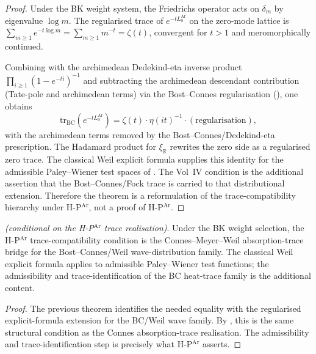 \begin{proof}
Under the BK weight system, the Friedrichs operator acts on
\(\delta_{m}\) by eigenvalue \(\log m\). The regularised trace of
\(e^{-tL_{0}^{\mathrm{Ar}}}\) on the zero-mode lattice is
\(\sum_{m\geq 1}e^{-t\log m}=\sum_{m\geq 1}m^{-t}=\zeta(t)\), convergent
for \(t>1\) and meromorphically continued.

Combining with the archimedean Dedekind-eta inverse product
\(\prod_{i\geq 1}(1-e^{-ti})^{-1}\) and subtracting the archimedean
descendant contribution (Tate-pole and archimedean terms) via the
Bost--Connes regularisation
(), one obtains
\begin{equation*}
\mathrm{tr}_{\mathrm{BC}}(e^{-tL_{0}^{\mathrm{Ar}}})
=\zeta(t)\cdot\eta(it)^{-1}\cdot(\text{regularisation}),
\end{equation*}
with the archimedean terms removed by the Bost--Connes/Dedekind-eta
prescription. The Hadamard product for \(\xi_{\mathbb R}\) rewrites
the zero side as a regularised zero trace. The classical Weil explicit
formula supplies this identity for the admissible Paley--Wiener test
spaces of . The
Vol~IV condition is the additional assertion that the
Bost--Connes/Fock trace is carried to that distributional extension.
Therefore the theorem is a reformulation of the trace-compatibility
hierarchy under H-P\(^{\mathrm{Ar}}\), not a proof of
H-P\(^{\mathrm{Ar}}\).
\end{proof}

\begin{corollary}
\label{v4-arith:hpar-det:cor:hierarchy-is-weil}
\ClaimStatusProvedHere \emph{(conditional on the H-P\(^{\mathrm{Ar}}\)
trace realisation)}. Under the BK weight selection, the
H-P\(^{\mathrm{Ar}}\) trace-compatibility condition is the
Connes--Meyer--Weil absorption-trace bridge for the
Bost--Connes/Weil wave-distribution family. The classical Weil explicit
formula applies to admissible Paley--Wiener test functions; the
admissibility and trace-identification of the BC heat-trace family is
the additional content.
\end{corollary}

\begin{proof}
The previous theorem identifies the needed equality with the
regularised explicit-formula extension for the BC/Weil wave family.
By , this is the
same structural condition as the Connes absorption-trace
realisation. The admissibility and trace-identification step is
precisely what H-P\(^{\mathrm{Ar}}\) asserts.
\end{proof}

